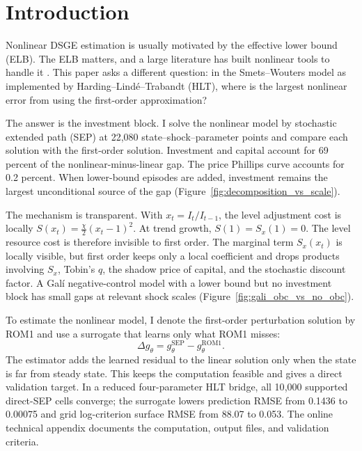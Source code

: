 \documentclass[12pt]{article}
\theoremstyle{plain}
\theoremstyle{definition}
\theoremstyle{remark}
\begin{document}
\clearpage

\tableofcontents
\clearpage


\section{Introduction}
\label{sec:introduction}

Nonlinear DSGE estimation is usually motivated by the effective lower bound
(ELB). The ELB matters, and a large literature has built nonlinear tools to
handle it \citep{gust2012effects,boehl2022monetary,guerrieri2015occbin}. This
paper asks a different question: in the Smets--Wouters model as implemented by
Harding--Lind\'e--Trabandt (HLT), where is the largest nonlinear error from
using the first-order approximation?

The answer is the investment block. I solve the nonlinear model by stochastic
extended path (SEP) at 22,080 state--shock--parameter points and compare each
solution with the first-order solution. Investment and capital account for 69
percent of the nonlinear-minus-linear gap. The price Phillips curve accounts
for 0.2 percent. When lower-bound episodes are added, investment remains the
largest unconditional source of the gap (Figure~\ref{fig:decomposition_vs_scale}).

The mechanism is transparent. With \(x_t=I_t/I_{t-1}\), the level adjustment
cost is locally \(S(x_t)=\tfrac{\chi}{2}(x_t-1)^2\). At trend growth,
\(S(1)=S_x(1)=0\). The level resource cost is therefore invisible to first
order. The marginal term \(S_x(x_t)\) is locally visible, but first order keeps
only a local coefficient and drops products involving \(S_x\), Tobin's \(q\),
the shadow price of capital, and the stochastic discount factor. A Gal\'i
negative-control model with a lower bound but no investment block has small
gaps at relevant shock scales (Figure~\ref{fig:gali_obc_vs_no_obc}).

To estimate the nonlinear model, I denote the first-order perturbation solution
by ROM1 and use a surrogate that learns only what ROM1 misses:
\[
  \Delta g_\theta = g_\theta^{\mathrm{SEP}}-g_\theta^{\mathrm{ROM1}}.
\]
The estimator adds the learned residual to the linear solution only when the
state is far from steady state. This keeps the computation feasible and gives a
direct validation target. In a reduced four-parameter HLT bridge, all
10{,}000 supported direct-SEP cells converge; the surrogate lowers prediction RMSE
from 0.1436 to 0.00075 and grid log-criterion surface RMSE from 88.07 to 0.053. The
online technical appendix documents the computation, output files, and
validation criteria.
\end{document}
